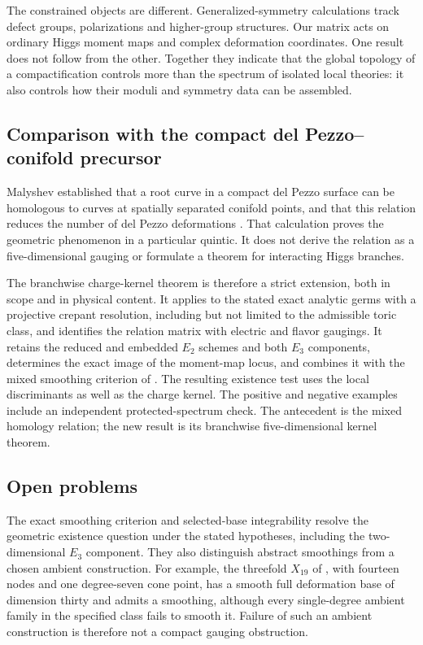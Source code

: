 The constrained objects are different. Generalized-symmetry calculations
track defect groups, polarizations and higher-group structures. Our matrix
acts on ordinary Higgs moment maps and complex deformation coordinates. One
result does not follow from the other. Together they indicate that the global
topology of a compactification controls more than the spectrum of isolated
local theories: it also controls how their moduli and symmetry data can be
assembled.

\subsection{Comparison with the compact del Pezzo--conifold precursor}
\label{subsec:malyshev-comparison}

Malyshev established that a root curve in a compact del Pezzo surface can be
homologous to curves at spatially separated conifold points, and that this
relation reduces the number of del Pezzo deformations
\cite{Malyshev:2007zz}. That calculation proves the geometric phenomenon in a
particular quintic. It does not derive the relation as a five-dimensional
gauging or formulate a theorem for interacting Higgs branches.

The branchwise charge-kernel theorem is therefore a strict extension, both in
scope and in physical content. It applies to the stated exact analytic
germs with a projective crepant resolution, including but not limited to
the admissible toric class, and identifies the relation matrix with electric and flavor gaugings.
It retains the reduced and embedded $E_2$ schemes and both $E_3$ components,
determines the exact image of the moment-map locus, and combines it with the
mixed smoothing criterion of \cite{Wuebben:2026smoothing}. The resulting
existence test uses the local discriminants as well as the charge kernel.
The positive and negative examples include
an independent protected-spectrum check. The antecedent is the mixed homology
relation; the new result is its branchwise five-dimensional kernel theorem.

\subsection{Open problems}
\label{subsec:open-problems}

The exact smoothing criterion and selected-base integrability resolve the
geometric existence question under the stated hypotheses, including the
two-dimensional $E_3$ component. They also distinguish abstract smoothings
from a chosen ambient construction. For example, the threefold $X_{19}$
of \cite[Corollary~9.3]{Wuebben:2026smoothing}, with fourteen nodes and
one degree-seven cone point, has a smooth full deformation base of
dimension thirty and admits a smoothing, although every single-degree
ambient family in the specified class fails to smooth it. Failure of such
an ambient construction is therefore not a compact gauging obstruction.

